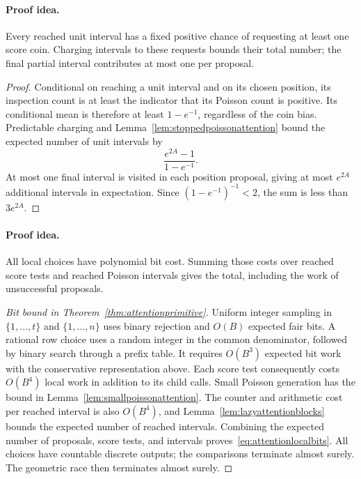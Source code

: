 \paragraph{Proof idea.}
Every reached unit interval has a fixed positive chance of requesting at least one score coin.  Charging intervals to these requests bounds their total number; the final partial interval contributes at most one per proposal.

\begin{proof}
Conditional on reaching a unit interval and on its chosen position, its
inspection count is at least the indicator that its Poisson count is
positive.  Its conditional mean is therefore at least $1-e^{-1}$,
regardless of the coin bias.  Predictable charging and
Lemma~\ref{lem:stoppedpoissonattention} bound the expected number of unit
intervals by
\[
 \frac{e^{2A}-1}{1-e^{-1}}.
\]
At most one final interval is visited in each position proposal, giving
at most $e^{2A}$ additional intervals in expectation.  Since
$(1-e^{-1})^{-1}<2$, the sum is less than $3e^{2A}$.
\end{proof}

\paragraph{Proof idea.}
All local choices have polynomial bit cost.  Summing those costs over reached score tests and reached Poisson intervals gives the total, including the work of unsuccessful proposals.

\begin{proof}[Bit bound in Theorem~\ref{thm:attentionprimitive}]
Uniform integer sampling in $\{1,\ldots,t\}$ and
$\{1,\ldots,n\}$ uses binary rejection and $O(B)$ expected fair bits.
A rational row choice uses a random integer in the common denominator,
followed by binary search through a prefix table.  It requires $O(B^3)$
expected bit work with the conservative representation above.
Each score test consequently costs $O(B^4)$ local work in addition to
its child calls.  Small Poisson generation has the bound in
Lemma~\ref{lem:smallpoissonattention}.  The counter and arithmetic cost
per reached interval is also $O(B^4)$, and
Lemma~\ref{lem:lazyattentionblocks} bounds the expected number of
reached intervals.  Combining the expected number of
proposals, score tests, and intervals proves~\eqref{eq:attentionlocalbits}.
All choices have countable discrete outputs; the comparisons terminate
almost surely.  The geometric race then terminates almost surely.
\end{proof}

